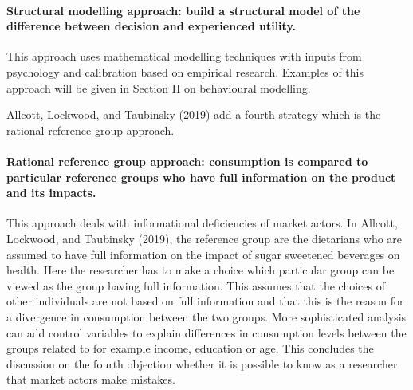\documentclass[
]{book}
\begin{document}
\hypertarget{structural-modelling-approach-build-a-structural-model-of-the-difference-between-decision-and-experienced-utility.}{%
\paragraph{\texorpdfstring{\textbf{Structural modelling approach}: build a structural model of the difference between decision and experienced utility.}{Structural modelling approach: build a structural model of the difference between decision and experienced utility.}}\label{structural-modelling-approach-build-a-structural-model-of-the-difference-between-decision-and-experienced-utility.}}

This approach uses mathematical modelling techniques with inputs from psychology and calibration based on empirical research. Examples of this approach will be given in Section II on behavioural modelling.

Allcott, Lockwood, and Taubinsky (2019) add a fourth strategy which is the rational reference group approach.

\hypertarget{rational-reference-group-approach-consumption-is-compared-to-particular-reference-groups-who-have-full-information-on-the-product-and-its-impacts.}{%
\paragraph{\texorpdfstring{\textbf{Rational reference group approach}: consumption is compared to particular reference groups who have full information on the product and its impacts.}{Rational reference group approach: consumption is compared to particular reference groups who have full information on the product and its impacts.}}\label{rational-reference-group-approach-consumption-is-compared-to-particular-reference-groups-who-have-full-information-on-the-product-and-its-impacts.}}

This approach deals with informational deficiencies of market actors. In Allcott, Lockwood, and Taubinsky (2019), the reference group are the dietarians who are assumed to have full information on the impact of sugar sweetened beverages on health. Here the researcher has to make a choice which particular group can be viewed as the group having full information. This assumes that the choices of other individuals are not based on full information and that this is the reason for a divergence in consumption between the two groups. More sophisticated analysis can add control variables to explain differences in consumption levels between the groups related to for example income, education or age. This concludes the discussion on the fourth objection whether it is possible to know as a researcher that market actors make mistakes.
\end{document}

